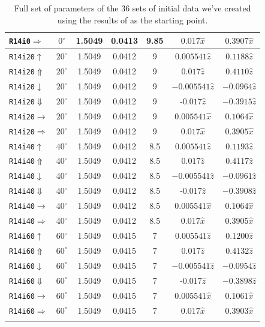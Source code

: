 \begin{longtable}{l|c|c|c|c|c|c}
{\tt R14i0$\Rightarrow$}&$0^\circ$ & 1.5049 & 0.0413 & 9.85 & $0.017\hat{x}$ & $0.3907\hat{x}$ \\
\hline
{\tt R14i20$\uparrow$}&$20^\circ$ & 1.5049 & 0.0412 & 9 & $0.005541\hat{z}$ & $0.1188\hat{z}$ \\
{\tt R14i20$\Uparrow$}&$20^\circ$ & 1.5049 & 0.0412 & 9 & $0.017\hat{z}$ & $0.4110\hat{z}$ \\
{\tt R14i20$\downarrow$}&$20^\circ$ & 1.5049 & 0.0412 & 9 &  $-0.005541\hat{z}$& $-0.0964\hat{z}$\\
{\tt R14i20$\Downarrow$}&$20^\circ$ & 1.5049 & 0.0412 & 9 & -$0.017\hat{z}$ & $-0.3915\hat{z}$ \\
{\tt R14i20$\rightarrow$}&$20^\circ$ & 1.5049 & 0.0412 & 9 & $0.005541\hat{x}$ & $0.1064\hat{x}$\\
{\tt R14i20$\Rightarrow$}&$20^\circ$ & 1.5049 & 0.0412 & 9 & $0.017\hat{x}$ & $0.3905\hat{x}$ \\
\hline
{\tt R14i40$\uparrow$}&$40^\circ$ & 1.5049 & 0.0412 & 8.5 &  $0.005541\hat{z}$ & $0.1193\hat{z}$ \\
{\tt R14i40$\Uparrow$}&$40^\circ$ & 1.5049 & 0.0412 & 8.5 & $0.017\hat{z}$ & $0.4117\hat{z}$ \\
{\tt R14i40$\downarrow$}&$40^\circ$ & 1.5049 & 0.0412 & 8.5 & $-0.005541\hat{z}$& $-0.0961\hat{z}$\\
{\tt R14i40$\Downarrow$}&$40^\circ$ & 1.5049 & 0.0412 & 8.5 & -$0.017\hat{z}$ & $-0.3908\hat{z}$ \\
{\tt R14i40$\rightarrow$}&$40^\circ$ & 1.5049 & 0.0412 & 8.5 & $0.005541\hat{x}$ & $0.1064\hat{x}$\\
{\tt R14i40$\Rightarrow$}&$40^\circ$ & 1.5049 & 0.0412 & 8.5 & $0.017\hat{x}$ & $0.3905\hat{x}$ \\
\hline
{\tt R14i60$\uparrow$}&$60^\circ$ & 1.5049 & 0.0415 & 7 &  $0.005541\hat{z}$ & $0.1200\hat{z}$ \\
{\tt R14i60$\Uparrow$}&$60^\circ$ & 1.5049 & 0.0415 & 7 & $0.017\hat{z}$ & $0.4132\hat{z}$ \\
{\tt R14i60$\downarrow$}&$60^\circ$ & 1.5049 & 0.0415 & 7 & $-0.005541\hat{z}$& $-0.0954\hat{z}$\\
{\tt R14i60$\Downarrow$}&$60^\circ$ & 1.5049 & 0.0415 & 7 & -$0.017\hat{z}$ & $-0.3898\hat{z}$ \\
{\tt R14i60$\rightarrow$}&$60^\circ$ & 1.5049 & 0.0415 & 7 & $0.005541\hat{x}$ & $0.1061\hat{x}$\\
{\tt R14i60$\Rightarrow$}&$60^\circ$ & 1.5049 & 0.0415 & 7 & $0.017\hat{x}$ & $0.3903\hat{x}$ \\
\caption[Initial data set parameters for series of 36 Bh-Ns initial data sets.]{\label{tab:FullBHNSParameters}Full set of parameters of the 36 sets of initial data we've created using the results of
\cite{Foucart:2013a} as the starting point.}
\end{longtable}

